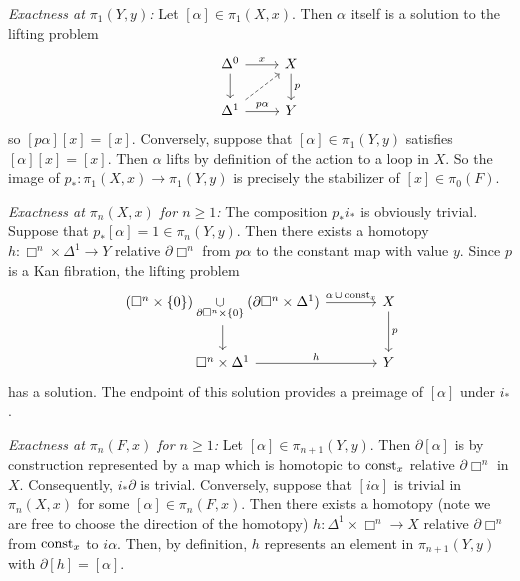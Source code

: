         \emph{Exactness at $\pi_1(Y, y)$:} Let $[\alpha] \in \pi_1(X, x)$. Then $\alpha$ itself is a solution to the lifting problem
        \begin{equation*}
            \begin{tikzcd}
                \Delta^0 \arrow[d] \arrow[r, "x"] & X \arrow[d, "p"] \\
                \Delta^1 \arrow[ur, dashed] \arrow[r, "p \alpha"] & Y
            \end{tikzcd}
        \end{equation*}
        so $[p \alpha][x] = [x]$. Conversely, suppose that $[\alpha] \in \pi_1(Y, y)$ satisfies $[\alpha][x] = [x]$. Then $\alpha$ lifts by definition of the action to a loop in $X$. So the image of $p_{*} \colon \pi_1(X, x) \to \pi_1(Y, y)$ is precisely the stabilizer of $[x] \in \pi_0(F)$.
        
        \emph{Exactness at $\pi_n(X, x)$ for $n \geq 1$:} The composition $p_{*} i_{*}$ is obviously trivial. Suppose that $p_{*} [\alpha] = 1 \in \pi_n(Y, y)$. Then there exists a homotopy $h \colon \Box^n \times \Delta^1 \to Y$ relative $\partial \Box^n$ from $p \alpha$ to the constant map with value $y$. Since $p$ is a Kan fibration, the lifting problem
        \begin{equation*}
            \begin{tikzcd}[column sep=large]
                (\Box^n \times \{0\}) \underset{\partial \Box^n \times \{0\}}{\cup} (\partial \Box^n \times \Delta^1) \arrow[d] \arrow[r, "\alpha \, \cup \, \const_x"] & X \arrow[d, "p"] \\
                \Box^n \times \Delta^1 \arrow[r, "h"] & Y
            \end{tikzcd}
        \end{equation*}
        has a solution. The endpoint of this solution provides a preimage of $[\alpha]$ under $i_{*}$.
        
        \emph{Exactness at $\pi_n(F, x)$ for $n \geq 1$:} Let $[\alpha] \in \pi_{n+1}(Y, y)$. Then $\partial [\alpha]$ is by construction represented by a map which is homotopic to $\operatorname{const}_x$ relative $\partial \Box^n$ in $X$. Consequently, $i_{*} \partial$ is trivial.
        Conversely, suppose that $[i \alpha]$ is trivial in $\pi_n(X, x)$ for some $[\alpha] \in \pi_n(F, x)$. Then there exists a homotopy (note we are free to choose the direction of the homotopy) $h \colon \Delta^1 \times \Box^n \to X$ relative $\partial \Box^n$ from $\operatorname{const}_x$ to $i \alpha$. Then, by definition, $h$ represents an element in $\pi_{n+1}(Y, y)$ with $\partial [h] = [\alpha]$.
        
